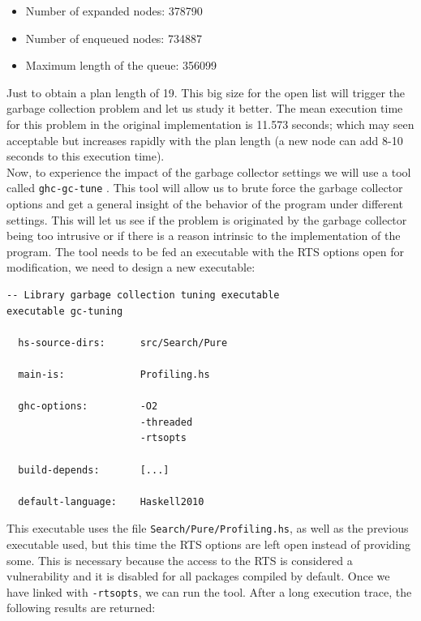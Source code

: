 \begin{itemize}
 \item Number of expanded nodes: 378790
 \item Number of enqueued nodes: 734887
 \item Maximum length of the queue: 356099
\end{itemize}

Just to obtain a plan length of 19. This big size for the open list will
trigger the garbage collection problem and let us study it better. The mean
execution time for this problem in the original implementation is 11.573
seconds; which may seen acceptable but increases rapidly with the plan length
(a new node can add 8-10 seconds to this execution time).\\

Now, to experience the impact of the garbage collector settings we will use a
tool called \texttt{ghc-gc-tune} \cite{ghc-gc-tune}. This tool will allow us to
brute force the garbage collector options and get a general insight of the
behavior of the program under different settings. This will let us see if the
problem is originated by the garbage collector being too intrusive or if there
is a reason intrinsic to the implementation of the program. The tool needs to
be fed an executable with the RTS options open for modification, we need to
design a new executable:\\

\begin{lstlisting}[style=haskell, label=gc-cabal, caption=
Setup for the \texttt{gc-tuning} executable in the Cabal file]
-- Library garbage collection tuning executable
executable gc-tuning

  hs-source-dirs:      src/Search/Pure
           
  main-is:             Profiling.hs
  
  ghc-options:         -O2
                       -threaded
                       -rtsopts

  build-depends:       [...]

  default-language:    Haskell2010
\end{lstlisting}

This executable uses the file \texttt{Search/Pure/Profiling.hs}, as well as the
previous executable used, but this time the RTS options are left open instead
of providing some. This is necessary because the access to the RTS is
considered a vulnerability and it is disabled for all packages compiled by
default. Once we have linked with \texttt{-rtsopts}, we can run the tool. After
a long execution trace, the following results are returned:\\

